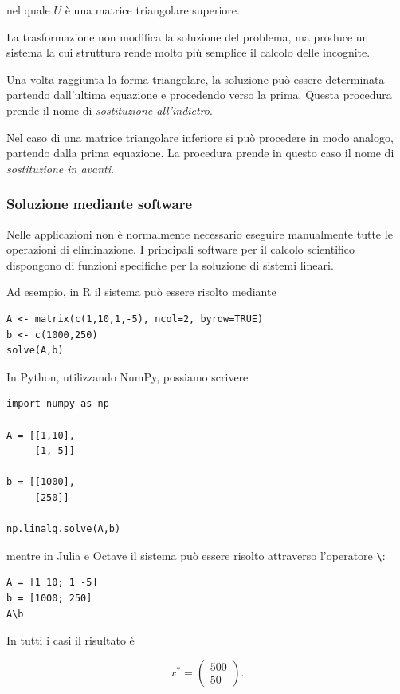 nel quale $U$ è una matrice triangolare superiore.

La trasformazione non modifica la soluzione del problema, ma produce
un sistema la cui struttura rende molto più semplice il calcolo delle
incognite.

Una volta raggiunta la forma triangolare, la soluzione può essere
determinata partendo dall'ultima equazione e procedendo verso la
prima. Questa procedura prende il nome di \emph{sostituzione
all'indietro}.

Nel caso di una matrice triangolare inferiore si può procedere in
modo analogo, partendo dalla prima equazione. La procedura prende
in questo caso il nome di \emph{sostituzione in avanti}.


\subsubsection{Soluzione mediante software}

Nelle applicazioni non è normalmente necessario eseguire
manualmente tutte le operazioni di eliminazione. I principali
software per il calcolo scientifico dispongono di funzioni
specifiche per la soluzione di sistemi lineari.

Ad esempio, in \textsf{R} il sistema può essere risolto mediante

\begin{verbatim}
A <- matrix(c(1,10,1,-5), ncol=2, byrow=TRUE)
b <- c(1000,250)
solve(A,b)
\end{verbatim}

In \textsf{Python}, utilizzando \textsf{NumPy}, possiamo scrivere

\begin{verbatim}
import numpy as np

A = [[1,10],
     [1,-5]]

b = [[1000],
     [250]]

np.linalg.solve(A,b)
\end{verbatim}

mentre in \textsf{Julia} e \textsf{Octave} il sistema può essere
risolto attraverso l'operatore \texttt{\textbackslash}:

\begin{verbatim}
A = [1 10; 1 -5]
b = [1000; 250]
A\b
\end{verbatim}

In tutti i casi il risultato è

\begin{equation*}
    x^*=
    \begin{pmatrix}
        500\\
        50
    \end{pmatrix}.
\end{equation*}

